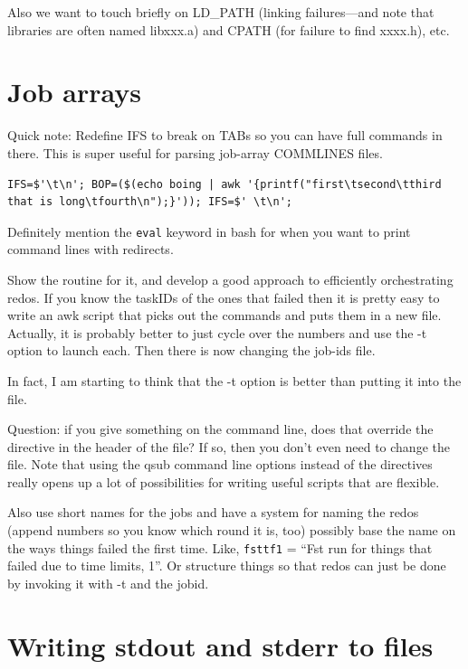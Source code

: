 \documentclass[]{krantz}
\begin{document}
Also we want to touch briefly on LD\_PATH (linking failures---and note that libraries are often
named libxxx.a) and CPATH (for failure to find xxxx.h), etc.

\hypertarget{job-arrays}{%
\section{Job arrays}\label{job-arrays}}

Quick note: Redefine IFS to break on TABs so you can have full commands in there.
This is super useful for parsing job-array COMMLINES files.

\begin{verbatim}
IFS=$'\t\n'; BOP=($(echo boing | awk '{printf("first\tsecond\tthird that is long\tfourth\n");}')); IFS=$' \t\n';
\end{verbatim}

Definitely mention the \texttt{eval} keyword in bash for when you want to print
command lines with redirects.

Show the routine for it, and develop a good approach to efficiently
orchestrating redos. If you know the taskIDs of the ones that failed
then it is pretty easy to write an awk script that picks out the
commands and puts them in a new file. Actually, it is probably
better to just cycle over the numbers and use the -t option
to launch each. Then there is now changing the job-ids file.

In fact, I am starting to think that the -t option is better than
putting it into the file.

Question: if you give something on the command line, does that override
the directive in the header of the file? If so, then you don't even
need to change the file. Note that using the qsub command line options
instead of the directives really opens up a lot of possibilities for
writing useful scripts that are flexible.

Also use short names for the jobs and have a system for naming the
redos (append numbers so you know which round it is, too)
possibly base the name on the ways things failed the first time. Like,
\texttt{fsttf1} = ``Fst run for things that failed due to time limits, 1''. Or
structure things so that redos can just be done by invoking it with -t
and the jobid.

\hypertarget{writing-stdout-and-stderr-to-files}{%
\section{Writing stdout and stderr to files}\label{writing-stdout-and-stderr-to-files}}
\end{document}
